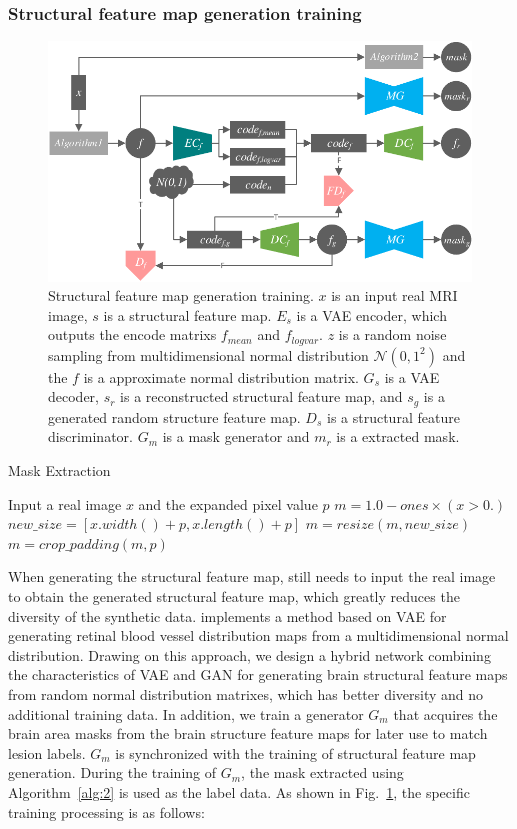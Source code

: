 \documentclass{ecai}
\begin{document}
\subsubsection{Structural feature map generation training}
\begin{figure}
	\centering
	\includegraphics[width=0.98\columnwidth]{figures/feature_train}
	\caption{Structural feature map generation training. $x$ is an input real MRI image, $s$ is a structural feature map. $E_s$ is a VAE encoder, which outputs the encode matrixs $f_{mean}$ and $f_{logvar}$. $z$ is a random noise sampling from multidimensional normal distribution $\mathcal{N}(0,1^2)$ and the $f$ is a approximate normal distribution matrix. $G_s$ is a VAE decoder, $s_r$ is a reconstructed structural feature map, and $s_g$ is a generated random structure feature map. $D_{s}$ is a structural feature discriminator. $G_m$ is a mask generator and $m_r$ is a extracted mask. }
	\label{feature_train}
\end{figure}
\begin{algorithm}
	\caption{Mask Extraction}
	\label{alg:2}
	\begin{algorithmic}[1]
		\State Input a real image $x$ and the expanded pixel value $p$
		\State $m = 1.0 - ones \times (x > 0.)$
		\State $new\_size=[x.width() + p, x.length() + p]$
		\State $m = resize(m, new\_size)$
		\State $m = crop\_padding(m,p)$
	\end{algorithmic}  
\end{algorithm}
When generating the structural feature map, \cite{4shin2018medical} still needs to input the real image to obtain the generated structural feature map, which greatly reduces the diversity of the synthetic data. \cite{41costa2017towards} implements a method based on VAE for generating retinal blood vessel distribution maps from a multidimensional normal distribution. Drawing on this approach, we design a hybrid network combining the characteristics of VAE and GAN for generating brain structural feature maps from random normal distribution matrixes, which has better diversity and no additional training data. In addition, we train a generator $G_m$ that acquires the brain area masks from the brain structure feature maps for later use to match lesion labels. $G_m$ is synchronized with the training of structural feature map generation. During the training of $G_m$, the mask extracted using Algorithm~\ref{alg:2} is used as the label data. As shown in Fig.~\ref{feature_train}, the specific training processing is as follows:
\end{document}
